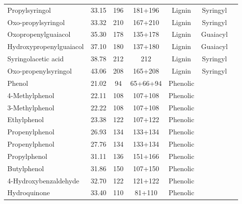 \begin{table}[h!]
\begin{center}
{\begin{tabular}{lcccccc}
Propylsyringol & 33.15 & 196 & 181+196 &Lignin&Syringyl\\ 
Oxo-propylsyringol & 33.32 & 210 & 167+210 &Lignin&Syringyl\\ 
Oxopropenylguaiacol & 35.30 & 178 & 135+178 &Lignin&Guaiacyl\\ 
Hydroxypropenylguaiacol & 37.10 & 180 & 137+180 &Lignin&Guaiacyl\\ 
Syringolacetic acid & 38.78 & 212 & 212 &Lignin&Syringyl\\ 
Oxo-propenylsyringol & 43.06 & 208 & 165+208 &Lignin&Syringyl\\ 
Phenol & 21.02 & 94 & 65+66+94 &Phenolic&\\ 
4-Methylphenol & 22.11 & 108 & 107+108 &Phenolic&\\ 
3-Methylphenol & 22.22 & 108 & 107+108 &Phenolic&\\ 
Ethylphenol & 23.38 & 122 & 107+122 &Phenolic&\\ 
Propenylphenol & 26.93 & 134 & 133+134 &Phenolic&\\ 
Propenylphenol & 27.76 & 134 & 133+134 &Phenolic&\\ 
Propylphenol & 31.11 & 136 & 151+166 &Phenolic&\\ 
Butylphenol & 31.86 & 150 & 107+150 &Phenolic&\\ 
4-Hydroxybenzaldehyde & 32.70 & 122 & 121+122 &Phenolic&\\ 
Hydroquinone & 33.40 & 110 & 81+110 &Phenolic&\\ 
   \hline
\end{tabular}
}
\end{center}
\end{table}
\newpage

